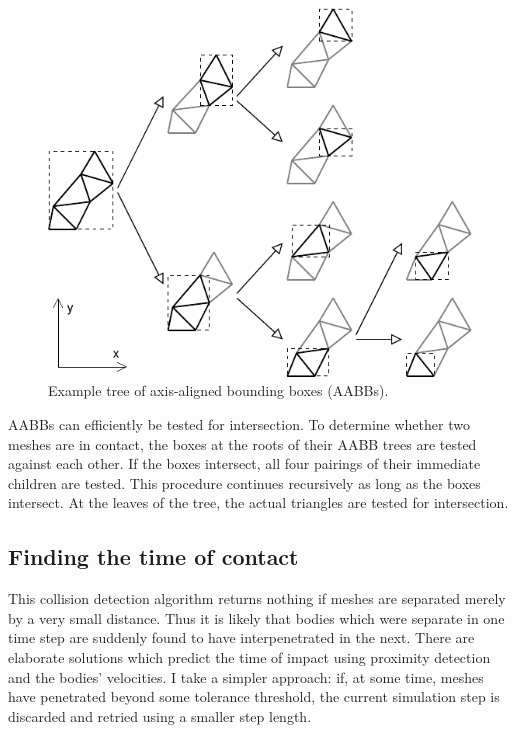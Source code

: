 \begin{figure}
\centerline{\includegraphics{figures/coll-volumes}}
\caption{Example tree of axis-aligned bounding boxes (AABBs).\label{collisionVolumes}}
\end{figure}

AABBs can efficiently be tested for intersection. To determine whether two meshes are in
contact, the boxes at the roots of their AABB trees are tested against each other. If the boxes
intersect, all four pairings of their immediate children are tested. This procedure continues
recursively as long as the boxes intersect. At the leaves of the tree, the actual triangles are
tested for intersection.

\subsection{Finding the time of contact\label{findingContactTime}}

This collision detection algorithm returns nothing if meshes are separated me\-re\-ly by a very
small distance. Thus it is likely that bodies which were separate in one time step are suddenly
found to have interpenetrated in the next. There are elaborate solutions which predict the time of
impact using proximity detection and the bodies' velocities. I take a simpler approach: if, at
some time, meshes have penetrated beyond some tolerance threshold, the current simulation step
is discarded and retried using a smaller step length.

